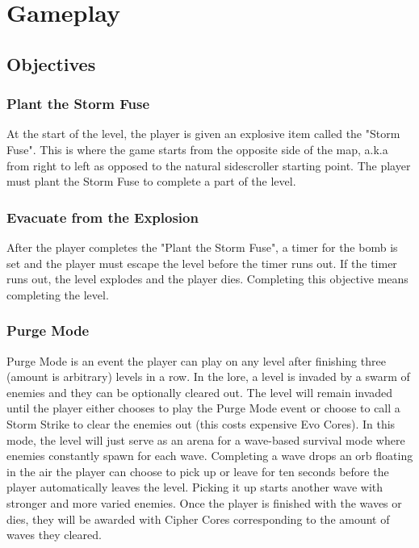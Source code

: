 \documentclass[12pt]{article}
\begin{document}
\section{Gameplay}

\subsection{Objectives}

\subsubsection{Plant the Storm Fuse}

At the start of the level, the player is given an explosive item called the "Storm Fuse". This is where the game starts from the  opposite side of the map, a.k.a from right to left as opposed to the natural sidescroller starting point. The player must plant the Storm Fuse to complete a part of the level. 

\subsubsection{Evacuate from the Explosion}

After the player completes the "Plant the Storm Fuse", a timer for the bomb is set and the player must escape the level before the timer runs out. If the timer runs out, the level explodes and the player dies. Completing this objective means completing the level. 

\subsubsection{Purge Mode}

Purge Mode is an event the player can play on any level after finishing three (amount is arbitrary) levels in a row. In the lore, a level is invaded by a swarm of enemies and they can be optionally cleared out. The level will remain invaded until the player either chooses to play the Purge Mode event or choose to call a Storm Strike to clear the enemies out (this costs expensive Evo Cores). In this mode, the level will just serve as an arena for a wave-based survival mode where enemies constantly spawn for each wave. Completing a wave drops an orb floating in the air the player can choose to pick up or leave for ten seconds before the player automatically leaves the level. Picking it up starts another wave with stronger and more varied enemies. Once the player is finished with the waves or dies, they will be awarded with Cipher Cores corresponding to the amount of waves they cleared.
\end{document}
